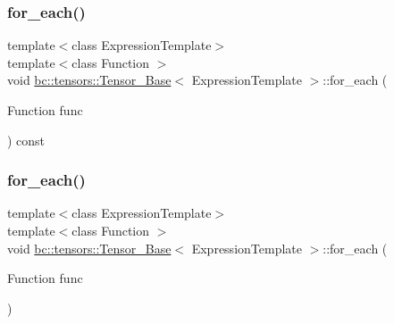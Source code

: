 \subsubsection{\texorpdfstring{for\+\_\+each()}{for\_each()}\hspace{0.1cm}{\footnotesize\ttfamily [1/2]}}
{\footnotesize\ttfamily template$<$class Expression\+Template$>$ \\
template$<$class Function $>$ \\
void \hyperlink{classbc_1_1tensors_1_1Tensor__Base}{bc\+::tensors\+::\+Tensor\+\_\+\+Base}$<$ Expression\+Template $>$\+::for\+\_\+each (\begin{DoxyParamCaption}\item[{Function}]{func }\end{DoxyParamCaption}) const\hspace{0.3cm}{\ttfamily [inline]}}

\mbox{\label{classbc_1_1tensors_1_1Tensor__Base_ae8e32bf8cf8d0c6da6310d4084d0e856}} 
\subsubsection{\texorpdfstring{for\+\_\+each()}{for\_each()}\hspace{0.1cm}{\footnotesize\ttfamily [2/2]}}
{\footnotesize\ttfamily template$<$class Expression\+Template$>$ \\
template$<$class Function $>$ \\
void \hyperlink{classbc_1_1tensors_1_1Tensor__Base}{bc\+::tensors\+::\+Tensor\+\_\+\+Base}$<$ Expression\+Template $>$\+::for\+\_\+each (\begin{DoxyParamCaption}\item[{Function}]{func }\end{DoxyParamCaption})\hspace{0.3cm}{\ttfamily [inline]}}

\mbox{\label{classbc_1_1tensors_1_1Tensor__Base_aa8ac3b29d433a70e336e4b67779c700a}} 
